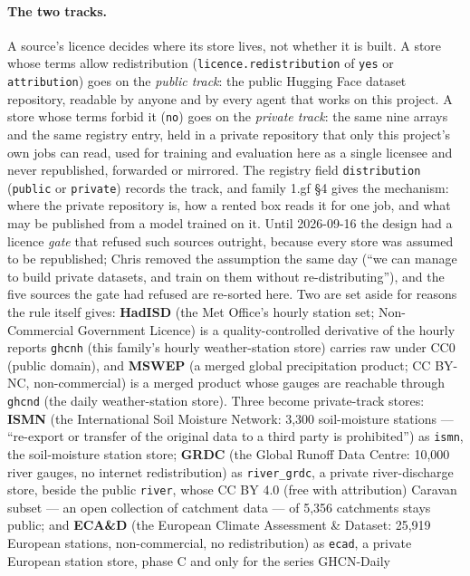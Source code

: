 \documentclass[10pt]{article}
\newcommand{\code}[1]{\texttt{#1}}
\begin{document}
\paragraph{The two tracks.} A source's licence decides where its store
lives, not whether it is built. A store whose terms allow redistribution
(\code{licence.redistribution} of \code{yes} or \code{attribution}) goes on
the \emph{public track}: the public Hugging Face dataset repository, readable
by anyone and by every agent that works on this project. A store whose terms
forbid it (\code{no}) goes on the \emph{private track}: the same nine arrays
and the same registry entry, held in a private repository that only this
project's own jobs can read, used for training and evaluation here as a
single licensee and never republished, forwarded or mirrored. The registry
field \code{distribution} (\code{public} or \code{private}) records the
track, and family 1.gf \S4 gives the mechanism: where the private repository
is, how a rented box reads it for one job, and what may be published from a
model trained on it. Until 2026-09-16 the design had a licence \emph{gate}
that refused such sources outright, because every store was assumed to be
republished; Chris removed the assumption the same day (``we can manage to
build private datasets, and train on them without re-distributing''), and
the five sources the gate had refused are re-sorted here. Two are set aside
for reasons the rule itself gives: \textbf{HadISD} (the Met Office's hourly station set; Non-Commercial Government
Licence) is a quality-controlled derivative of the hourly reports
\code{ghcnh} (this family's hourly weather-station store) carries raw under CC0 (public domain), and \textbf{MSWEP} (a merged global precipitation product; CC BY-NC, non-commercial) is a
merged product whose gauges are reachable through \code{ghcnd} (the daily weather-station store). Three become
private-track stores: \textbf{ISMN} (the International Soil Moisture Network: 3,300 soil-moisture stations ---
``re-export or transfer of the original data to a third party is
prohibited'') as \code{ismn}, the soil-moisture station store; \textbf{GRDC} (the Global Runoff Data Centre: 10,000 river gauges, no
internet redistribution) as \code{river\_grdc}, a private river-discharge store, beside the public
\code{river}, whose CC BY 4.0 (free with attribution) Caravan subset --- an open collection of catchment data --- of 5,356 catchments stays
public; and \textbf{ECA\&D} (the European Climate Assessment \& Dataset: 25,919 European stations, non-commercial, no
redistribution) as \code{ecad}, a private European station store, phase C and only for the series GHCN-Daily
\end{document}
